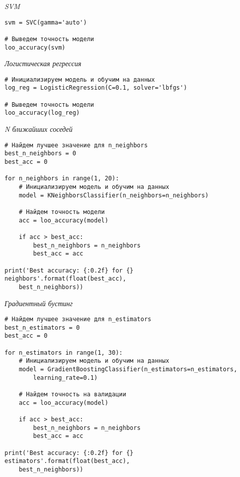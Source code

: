 \textit{SVM}

\begin{verbatim}
svm = SVC(gamma='auto')

# Выведем точность модели
loo_accuracy(svm)
\end{verbatim}

\textit{Логистическая регрессия}

\begin{verbatim}
# Инициализируем модель и обучим на данных
log_reg = LogisticRegression(C=0.1, solver='lbfgs')

# Выведем точность модели
loo_accuracy(log_reg)
\end{verbatim}

\textit{N ближайших соседей}

\begin{verbatim}
# Найдем лучшее значение для n_neighbors
best_n_neighbors = 0
best_acc = 0

for n_neighbors in range(1, 20):
    # Инициализируем модель и обучим на данных
    model = KNeighborsClassifier(n_neighbors=n_neighbors)
    
    # Найдем точность модели
    acc = loo_accuracy(model)
    
    if acc > best_acc:
        best_n_neighbors = n_neighbors
        best_acc = acc
        
print('Best accuracy: {:0.2f} for {} neighbors'.format(float(best_acc), 
    best_n_neighbors))
\end{verbatim}

\textit{Градиентный бустинг}

\begin{verbatim}
# Найдем лучшее значение для n_estimators
best_n_estimators = 0
best_acc = 0

for n_estimators in range(1, 30):
    # Инициализируем модель и обучим на данных
    model = GradientBoostingClassifier(n_estimators=n_estimators, 
        learning_rate=0.1)
    
    # Найдем точность на валидации
    acc = loo_accuracy(model)

    if acc > best_acc:
        best_n_neighbors = n_neighbors
        best_acc = acc
        
print('Best accuracy: {:0.2f} for {} estimators'.format(float(best_acc), 
    best_n_neighbors))
\end{verbatim}

